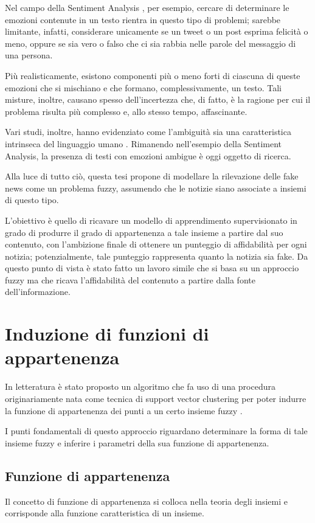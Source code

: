 \documentclass[12pt]{report}
\theoremstyle{definition}
\begin{document}
Nel campo della Sentiment Analysis \cite{18, 25}, per esempio, cercare di determinare le emozioni contenute in un testo rientra in questo tipo di problemi; sarebbe limitante, infatti, considerare unicamente se un tweet o un post esprima felicità o meno, oppure se sia vero o falso che ci sia rabbia nelle parole del messaggio di una persona.

Più realisticamente, esistono componenti più o meno forti di ciascuna di queste emozioni che si mischiano e che formano, complessivamente, un testo.
Tali misture, inoltre, causano spesso dell'incertezza che, di fatto, è la ragione per cui il problema risulta più complesso e, allo stesso tempo, affascinante.

Vari studi, inoltre, hanno evidenziato come l'ambiguità sia una caratteristica intrinseca del linguaggio umano \cite{26, 27}.
Rimanendo nell'esempio della Sentiment Analysis, la presenza di testi con emozioni ambigue è oggi oggetto di ricerca.

Alla luce di tutto ciò, questa tesi propone di modellare la rilevazione delle fake news come un problema fuzzy, assumendo che le notizie siano associate a insiemi di questo tipo.

L'obiettivo è quello di ricavare un modello di apprendimento supervisionato in grado di produrre il grado di appartenenza a tale insieme a partire dal suo contenuto, con l'ambizione finale di ottenere un punteggio di affidabilità per ogni notizia;
potenzialmente, tale punteggio rappresenta quanto la notizia sia fake. Da questo punto di vista è stato fatto un lavoro simile \cite{35} che si basa su un approccio fuzzy ma che ricava l'affidabilità del contenuto a partire dalla fonte dell'informazione.

\section{Induzione di funzioni di appartenenza} \label{induzione}
In letteratura è stato proposto un algoritmo che fa uso di una procedura originariamente nata come tecnica di support vector clustering per poter indurre la funzione di appartenenza dei punti a un certo insieme fuzzy \cite{1}.

I punti fondamentali di questo approccio riguardano determinare la forma di tale insieme fuzzy e inferire i parametri della sua funzione di appartenenza.

\subsection{Funzione di appartenenza} \label{membership}
Il concetto di funzione di appartenenza si colloca nella teoria degli insiemi e corrisponde alla funzione caratteristica di un insieme.
\end{document}
